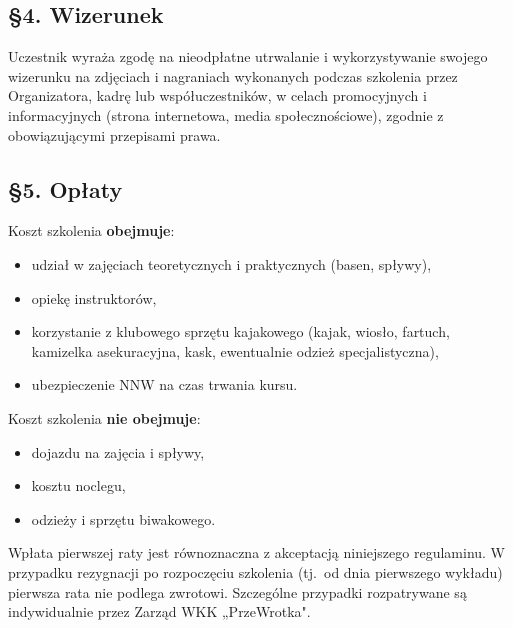 \subsection*{§4. Wizerunek}

Uczestnik wyraża zgodę na nieodpłatne utrwalanie i wykorzystywanie swojego wizerunku
na zdjęciach i nagraniach wykonanych podczas szkolenia przez Organizatora, kadrę lub
współuczestników, w celach promocyjnych i informacyjnych (strona internetowa, media
społecznościowe), zgodnie z obowiązującymi przepisami prawa.

\subsection*{§5. Opłaty}

Koszt szkolenia \textbf{obejmuje}:

\begin{itemize}[leftmargin=1.5em, itemsep=2pt]
  \item udział w zajęciach teoretycznych i praktycznych (basen, spływy),
  \item opiekę instruktorów,
  \item korzystanie z klubowego sprzętu kajakowego (kajak, wiosło, fartuch, kamizelka
    asekuracyjna, kask, ewentualnie odzież specjalistyczna),
  \item ubezpieczenie NNW na czas trwania kursu.
\end{itemize}

Koszt szkolenia \textbf{nie obejmuje}:

\begin{itemize}[leftmargin=1.5em, itemsep=2pt]
  \item dojazdu na zajęcia i spływy,
  \item kosztu noclegu,
  \item odzieży i sprzętu biwakowego.
\end{itemize}

Wpłata pierwszej raty jest równoznaczna z akceptacją niniejszego regulaminu. W przypadku
rezygnacji po rozpoczęciu szkolenia (tj.\ od dnia pierwszego wykładu) pierwsza rata
nie podlega zwrotowi. Szczególne przypadki rozpatrywane są indywidualnie przez Zarząd
WKK „PrzeWrotka".

